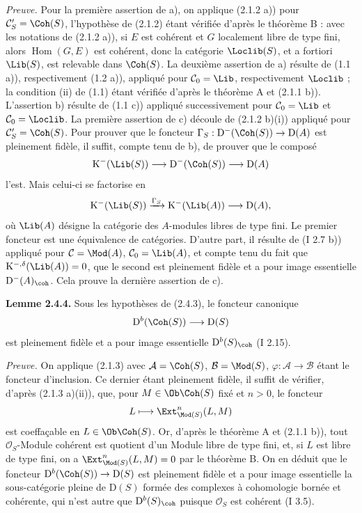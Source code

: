 \documentclass[11pt]{article}
\begin{document}
\emph{Preuve.} Pour la première assertion de a), on applique (2.1.2 a)) pour $\mathcal C'_S=\Coh(S)$, l'hypothèse de (2.1.2) étant vérifiée d'après le théorème B : avec les notations de (2.1.2 a)), si $E$ est cohérent et $G$ localement libre de type fini, alors $\operatorname{Hom}(G,E)$ est cohérent, donc la catégorie $\Loclib(S)$, et a fortiori $\Lib(S)$, est relevable dans $\Coh(S)$. La deuxième assertion de a) résulte de (1.1 a)), respectivement (1.2 a)), appliqué pour $\mathcal C_0=\Lib$, respectivement $\Loclib$ ; la condition (ii) de (1.1) étant vérifiée d'après le théorème A et (2.1.1 b)). L'assertion b) résulte de (1.1 c)) appliqué successivement pour $\mathcal C_0=\Lib$ et $\mathcal C_0=\Loclib$. La première assertion de c) découle de (2.1.2 b)(i)) appliqué pour $\mathcal C'_S=\Coh(S)$. Pour prouver que le foncteur $\Gamma_S:\mathrm D^{-}(\Coh(S))\to\mathrm D(A)$ est pleinement fidèle, il suffit, compte tenu de b), de prouver que le composé
\[
\mathrm K^{-}(\Lib(S))\longrightarrow\mathrm D^{-}(\Coh(S))\longrightarrow\mathrm D(A)
\]
l'est. Mais celui-ci se factorise en
\[
\mathrm K^{-}(\Lib(S))\xrightarrow{\Gamma_S}\mathrm K^{-}(\Lib(A))\longrightarrow\mathrm D(A),
\]
où $\Lib(A)$ désigne la catégorie des $A$-modules libres de type fini. Le premier foncteur est une équivalence de catégories. D'autre part, il résulte de (I 2.7 b)) appliqué pour $\mathcal C=\Mod(A)$, $\mathcal C_0=\Lib(A)$, et compte tenu du fait que $\mathrm K^{-,\delta}(\Lib(A))=0$, que le second est pleinement fidèle et a pour image essentielle $\mathrm D^{-}(A)_{\coh}$. Cela prouve la dernière assertion de c).

\textbf{Lemme 2.4.4.} Sous les hypothèses de (2.4.3), le foncteur canonique
\[
\mathrm D^b(\Coh(S))\longrightarrow\mathrm D(S)
\]
est pleinement fidèle et a pour image essentielle $\mathrm D^b(S)_{\coh}$ (I 2.15).

\emph{Preuve.} On applique (2.1.3) avec $\mathcal A=\Coh(S)$, $\mathcal B=\Mod(S)$, $\varphi:\mathcal A\to\mathcal B$ étant le foncteur d'inclusion. Ce dernier étant pleinement fidèle, il suffit de vérifier, d'après (2.1.3 a)(ii)), que, pour $M\in\Ob\Coh(S)$ fixé et $n>0$, le foncteur
\[
L\longmapsto \Ext^n_{\Mod(S)}(L,M)
\]
est coeffaçable en $L\in\Ob\Coh(S)$. Or, d'après le théorème A et (2.1.1 b)), tout $\mathcal O_S$-Module cohérent est quotient d'un Module libre de type fini, et, si $L$ est libre de type fini, on a $\Ext^n_{\Mod(S)}(L,M)=0$ par le théorème B. On en déduit que le foncteur $\mathrm D^b(\Coh(S))\to\mathrm D(S)$ est pleinement fidèle et a pour image essentielle la sous-catégorie pleine de $\mathrm D(S)$ formée des complexes à cohomologie bornée et cohérente, qui n'est autre que $\mathrm D^b(S)_{\coh}$ puisque $\mathcal O_S$ est cohérent (I 3.5).
\end{document}

